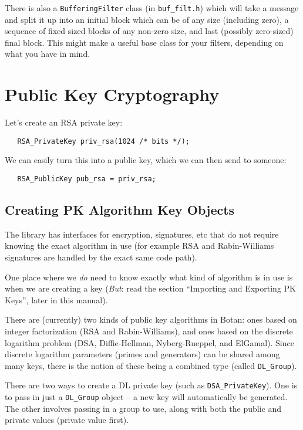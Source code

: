 \documentclass{article}
\newcommand{\filename}[1]{\texttt{#1}}
\newcommand{\type}[1]{\texttt{#1}}
\begin{document}
There is also a \type{BufferingFilter} class (in \filename{buf\_filt.h}) which
will take a message and split it up into an initial block which can be of any
size (including zero), a sequence of fixed sized blocks of any non-zero size,
and last (possibly zero-sized) final block. This might make a useful base class
for your filters, depending on what you have in mind.


\pagebreak
\section{Public Key Cryptography}

Let's create an RSA private key:

\begin{verbatim}
   RSA_PrivateKey priv_rsa(1024 /* bits */);
\end{verbatim}

We can easily turn this into a public key, which we can then send to
someone:

\begin{verbatim}
   RSA_PublicKey pub_rsa = priv_rsa;
\end{verbatim}




\subsection{Creating PK Algorithm Key Objects}

The library has interfaces for encryption, signatures, etc that do not require
knowing the exact algorithm in use (for example RSA and Rabin-Williams
signatures are handled by the exact same code path).

One place where we \emph{do} need to know exactly what kind of algorithm is in
use is when we are creating a key (\emph{But}: read the section ``Importing and
Exporting PK Keys'', later in this manual).

There are (currently) two kinds of public key algorithms in Botan: ones based
on integer factorization (RSA and Rabin-Williams), and ones based on the
discrete logarithm problem (DSA, Diffie-Hellman, Nyberg-Rueppel, and
ElGamal). Since discrete logarithm parameters (primes and generators) can be
shared among many keys, there is the notion of these being a combined type
(called \type{DL\_Group}).

There are two ways to create a DL private key (such as
\type{DSA\_PrivateKey}). One is to pass in just a \type{DL\_Group} object -- a
new key will automatically be generated. The other involves passing in a group
to use, along with both the public and private values (private value first).
\end{document}
